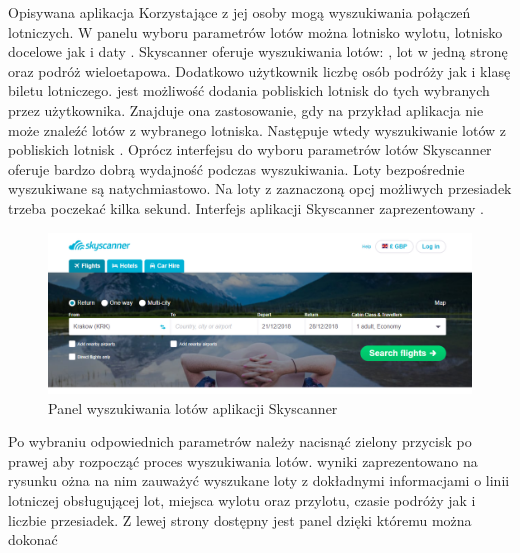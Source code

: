 \documentclass[12pt, twoside]{report}
\begin{document}
Opisywana aplikacja  Korzystające z jej osoby mogą  wyszukiwania połączeń lotniczych. W panelu wyboru parametrów lotów można  lotnisko wylotu, lotnisko docelowe jak i daty . Skyscanner oferuje   wyszukiwania lotów: , lot w jedną stronę oraz podróż wieloetapowa. Dodatkowo użytkownik  liczbę osób podróży jak i klasę biletu lotniczego.  jest możliwość dodania pobliskich lotnisk do tych wybranych przez użytkownika. Znajduje ona zastosowanie, gdy na przykład aplikacja nie może znaleźć lotów z wybranego lotniska. Następuje wtedy wyszukiwanie lotów z pobliskich lotnisk .
Oprócz  interfejsu do wyboru parametrów lotów Skyscanner oferuje bardzo dobrą wydajność podczas wyszukiwania. Loty bezpośrednie wyszukiwane są natychmiastowo. Na loty z zaznaczoną opcj możliwych przesiadek trzeba poczekać  kilka sekund. Interfejs aplikacji Skyscanner  zaprezentowany .
\begin{figure}[!ht]
\centering
\includegraphics[scale=0.50, keepaspectratio]{skyscanner_main.png}
\caption{Panel wyszukiwania lotów aplikacji Skyscanner}
\label{fig:skyscanner_main}
\end{figure}
Po wybraniu odpowiednich parametrów  należy nacisnąć zielony przycisk po prawej\add{,} aby rozpocząć proces wyszukiwania lotów.  wyniki zaprezentowano na rysunku ożna na nim zauważyć wyszukane loty z dokładnymi informacjami o linii lotniczej obsługującej lot, miejsca wylotu oraz przylotu, czasie podróży jak i liczbie przesiadek. Z lewej strony dostępny jest panel dzięki któremu można dokonać 
\end{document}
